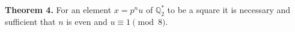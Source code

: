 \textbf{Theorem 4.} For an element $x = p^n u$ of $\mathbb{Q}_2^*$ to be a square it is necessary and sufficient that $n$ is even and $u \equiv 1 \pmod{8}$.

